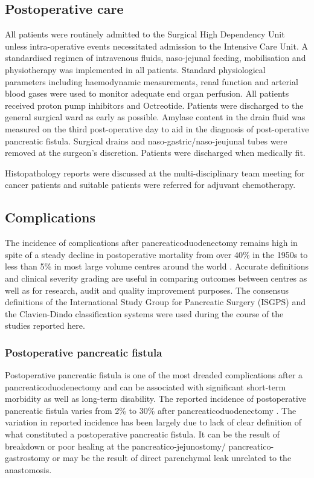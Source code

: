 \subsection{Postoperative care}
All patients were routinely admitted to the Surgical High Dependency Unit unless intra-operative events necessitated admission to the Intensive Care Unit. 
A standardised regimen of intravenous fluids, naso-jejunal feeding, mobilisation and physiotherapy was implemented in all patients. 
Standard physiological parameters including haemodynamic measurements, renal function and arterial blood gases were used to monitor adequate end organ perfusion. 
All patients received proton pump inhibitors and Octreotide. 
Patients were discharged to the general surgical ward as early as possible. 
Amylase content in the drain fluid was measured on the third post-operative day to aid in the diagnosis of post-operative pancreatic fistula. 
Surgical drains and naso-gastric/naso-jeujunal tubes were removed at the surgeon's discretion. 
Patients were discharged when medically fit.

Histopathology reports were discussed at the multi-disciplinary team meeting for cancer patients and suitable patients were referred for adjuvant chemotherapy.

\subsection{Complications}
The incidence of complications after pancreaticoduodenectomy remains high in spite of a steady decline in postoperative mortality from over 40\% in the 1950s to less than 5\% in most large volume centres around the world \parencite{deoliveira_assessment_2006, emick_hospital_2006, yeo_six_1997, winter_1423_2006, teh_patient_2009, gouma_rates_2000}. 
Accurate definitions and clinical severity grading are useful in comparing outcomes between centres as well as for research, audit and quality improvement purposes. 
The consensus definitions of the International Study Group for Pancreatic Surgery (ISGPS) and the Clavien-Dindo classification systems were used during the course of the studies reported here.

\subsubsection{Postoperative pancreatic fistula}
\label{sec:ch_intro_POPF}



Postoperative pancreatic fistula is one of the most dreaded complications after a pancreaticoduodenectomy and can be associated with significant short-term morbidity as well as long-term disability. 
The reported incidence of postoperative pancreatic fistula varies from 2\% to 30\% after pancreaticoduodenectomy \parencite{yeo_six_1997, deoliveira_assessment_2006, bassi_postoperative_2005, winter_biochemical_2007, pratt_risk_2008}. 
The variation in reported incidence has been largely due to lack of clear definition of what constituted a postoperative pancreatic fistula. 
It can be the result of breakdown or poor healing at the pancreatico-jejunostomy/ pancreatico-gastrostomy or may be the result of direct parenchymal leak unrelated to the anastomosis. 

